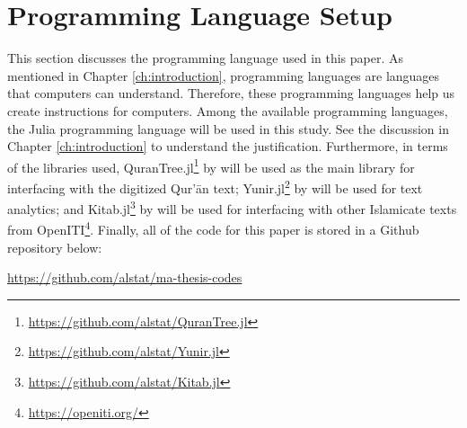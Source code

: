 \section{Programming Language Setup}\label{sec:method_code_setup}
This section discusses the programming language used in this paper. As mentioned in Chapter \ref{ch:introduction}, programming languages are languages that computers can understand. Therefore, these programming languages help us create instructions for computers. Among the available programming languages, the Julia programming language will be used in this study. See the discussion in Chapter \ref{ch:introduction} to understand the justification. Furthermore, in terms of the libraries used, QuranTree.jl\footnote{\url{https://github.com/alstat/QuranTree.jl}} by  will be used as the main library for interfacing with the digitized Qur'\=an text; Yunir.jl\footnote{\url{https://github.com/alstat/Yunir.jl}} by  will be used for text analytics; and Kitab.jl\footnote{\url{https://github.com/alstat/Kitab.jl}} by  will be used for interfacing with other Islamicate texts from \mbox{OpenITI}\footnote{\url{https://openiti.org/}}. Finally, all of the code for this paper is stored in a Github repository below:

\begin{center}
    \url{https://github.com/alstat/ma-thesis-codes}
\end{center}